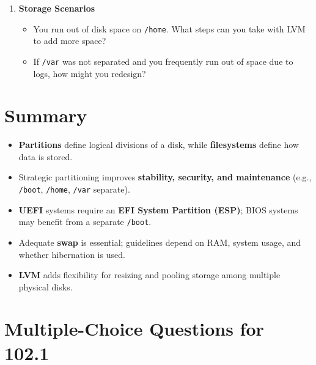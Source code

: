 \documentclass[a4paper]{report}
\begin{document}
\begin{enumerate}
    \item \textbf{Storage Scenarios}
    \begin{itemize}
        \item You run out of disk space on \texttt{/home}. What steps can you take with LVM to add more space?
        \item If \texttt{/var} was not separated and you frequently run out of space due to logs, how might you redesign?
    \end{itemize}
\end{enumerate}

\section*{Summary}

\begin{itemize}
    \item \textbf{Partitions} define logical divisions of a disk, while \textbf{filesystems} define how data is stored.
    \item Strategic partitioning improves \textbf{stability, security, and maintenance} (e.g., \texttt{/boot}, \texttt{/home}, \texttt{/var} separate).
    \item \textbf{UEFI} systems require an \textbf{EFI System Partition (ESP)}; BIOS systems may benefit from a separate \texttt{/boot}.
    \item Adequate \textbf{swap} is essential; guidelines depend on RAM, system usage, and whether hibernation is used.
    \item \textbf{LVM} adds flexibility for resizing and pooling storage among multiple physical disks.
\end{itemize}



\newpage
\section*{Multiple-Choice Questions for 102.1}
\end{document}
